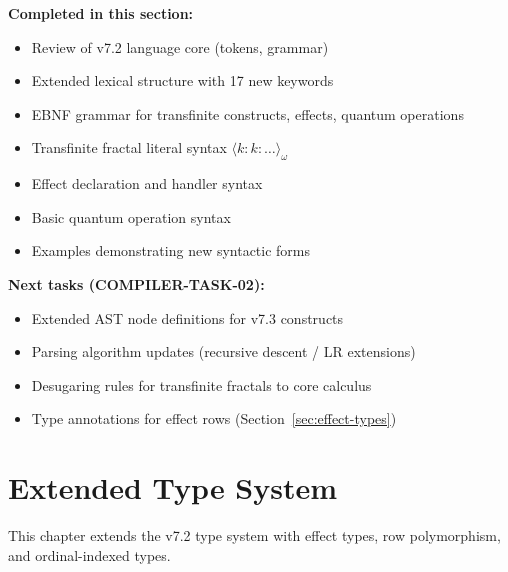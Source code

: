 \begin{tcolorbox}[colback=green!5!white,colframe=green!50!black,title=\textbf{Handoff: COMPILER-TASK-01 Complete},breakable]
\textbf{Completed in this section:}
\begin{itemize}
  \item Review of v7.2 language core (tokens, grammar)
  \item Extended lexical structure with 17 new keywords
  \item EBNF grammar for transfinite constructs, effects, quantum operations
  \item Transfinite fractal literal syntax $\langle k:k:\ldots\rangle_\omega$
  \item Effect declaration and handler syntax
  \item Basic quantum operation syntax
  \item Examples demonstrating new syntactic forms
\end{itemize}

\textbf{Next tasks (COMPILER-TASK-02):}
\begin{itemize}
  \item Extended AST node definitions for v7.3 constructs
  \item Parsing algorithm updates (recursive descent / LR extensions)
  \item Desugaring rules for transfinite fractals to core calculus
  \item Type annotations for effect rows (Section~\ref{sec:effect-types})
\end{itemize}
\end{tcolorbox}

\chapter{Extended Type System}
\label{ch:extended-type-system}

\begin{tcolorbox}[colback=blue!5!white,colframe=blue!75!black,title=\vnewthree]
This chapter extends the v7.2 type system with effect types, row polymorphism, and ordinal-indexed types.
\end{tcolorbox}

